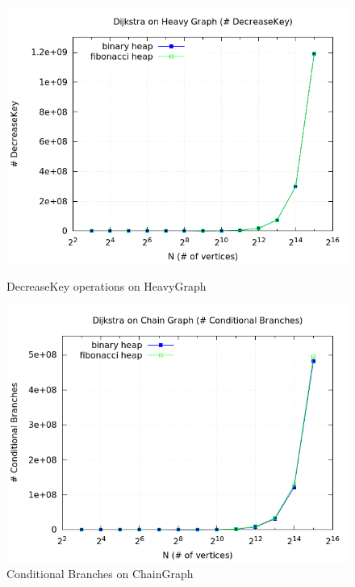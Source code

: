 \documentclass[a4paper,oneside,article,11pt]{memoir}
\begin{document}
\begin{figure}[H]
\centering
\begin{minipage}{0.48\columnwidth}
  \centering
  \includegraphics[width=\linewidth]{../res/dijkstra/d_heavy_dk.png}%
  \caption{DecreaseKey operations on HeavyGraph}
  \label{fig:dijkstra_heavy_dk}
\end{minipage}%
\hfill
\begin{minipage}{0.48\columnwidth}
  \centering
  \includegraphics[width=\linewidth]{../res/dijkstra/d_chain_br.png}%
  \caption{Conditional Branches on ChainGraph}
  \label{fig:dijkstra_chain_br}
\end{minipage}
\end{figure}
\end{document}
